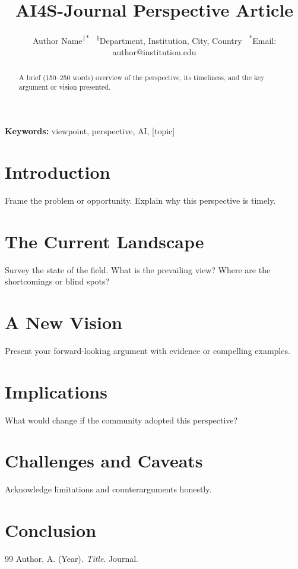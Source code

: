 \documentclass[12pt,a4paper]{article}
\title{\textbf{\textcolor{ai4sgold}{AI4S-Journal} Perspective Article}}
\author{Author Name\textsuperscript{1*} \
\textsuperscript{1}Department, Institution, City, Country \
\textsuperscript{*}Email: author@institution.edu}
\date{}
\begin{document}
\maketitle

\begin{abstract}
A brief (150--250 words) overview of the perspective, its timeliness,
and the key argument or vision presented.
\end{abstract}
\noindent\textbf{Keywords:} viewpoint, perspective, AI, [topic]

\section{Introduction}
Frame the problem or opportunity. Explain why this perspective is timely.

\section{The Current Landscape}
Survey the state of the field. What is the prevailing view? Where are the
shortcomings or blind spots?

\section{A New Vision}
Present your forward-looking argument with evidence or compelling examples.

\section{Implications}
What would change if the community adopted this perspective?

\section{Challenges and Caveats}
Acknowledge limitations and counterarguments honestly.

\section{Conclusion}


\begin{thebibliography}{99}
 Author, A. (Year). \textit{Title}. Journal.
\end{thebibliography}
\end{document}
